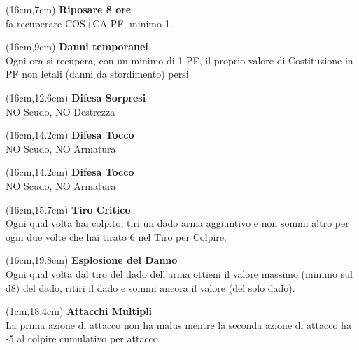 \documentclass[a4paper,12 pt,openany]{book}
\begin{document}
	\begin{textblock*}{4cm}(16cm,7cm) %
\textbf{Riposare 8 ore} \\fa recuperare COS+CA PF, minimo 1.
		\end{textblock*}


		\begin{textblock*}{4cm}(16cm,9cm) %
\textbf{Danni temporanei}\\ Ogni ora si recupera, con un minimo di 1 PF, il proprio valore di Costituzione in PF non letali (danni da stordimento) persi.
	\end{textblock*}


\begin{textblock*}{4cm}(16cm,12.6cm) %
\textbf{Difesa Sorpresi}\\NO Scudo, NO Destrezza
\end{textblock*}

\begin{textblock*}{4cm}(16cm,14.2cm) %
\textbf{Difesa Tocco}\\ NO Scudo, NO Armatura
\end{textblock*}



\begin{textblock*}{4cm}(16cm,14.2cm) %
	\textbf{Difesa Tocco}\\ NO Scudo, NO Armatura
\end{textblock*}


\begin{textblock*}{4cm}(16cm,15.7cm) %
\textbf{Tiro Critico}\\
Ogni qual volta hai colpito, tiri un dado arma aggiuntivo e non sommi altro per ogni due volte che hai tirato 6 nel Tiro per Colpire.
\end{textblock*}

\begin{textblock*}{4cm}(16cm,19.8cm) %
\textbf{Esplosione del Danno}\\
Ogni qual volta dal tiro del dado dell’arma ottieni il valore massimo (minimo sul d8) del dado, ritiri il dado e sommi ancora il valore (del solo dado).
\end{textblock*}


\begin{textblock*}{4cm}(1cm,18.4cm) %
	\textbf{Attacchi Multipli}\\
La prima azione di attacco non ha malus mentre la seconda azione di attacco ha -5 al colpire cumulativo per attacco
\end{textblock*}
\end{document}
